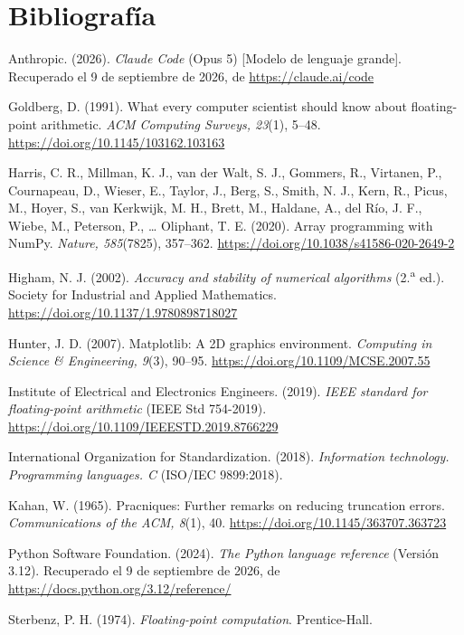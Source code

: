\section{Bibliografía}
\begin{list}{}{%
  \setlength{\leftmargin}{1.27cm}%
  \setlength{\itemindent}{-1.27cm}%
  \setlength{\labelwidth}{0pt}%
  \setlength{\labelsep}{0pt}%
  \setlength{\itemsep}{0.6em}%
  \setlength{\parsep}{0pt}%
}
  \item[] Anthropic. (2026). \textit{Claude Code} (Opus 5) [Modelo de lenguaje grande]. Recuperado el 9 de septiembre de 2026, de \url{https://claude.ai/code}

  \item[] Goldberg, D. (1991). What every computer scientist should know about floating-point arithmetic. \textit{ACM Computing Surveys, 23}(1), 5--48. \url{https://doi.org/10.1145/103162.103163}

  \item[] Harris, C. R., Millman, K. J., van der Walt, S. J., Gommers, R., Virtanen, P., Cournapeau, D., Wieser, E., Taylor, J., Berg, S., Smith, N. J., Kern, R., Picus, M., Hoyer, S., van Kerkwijk, M. H., Brett, M., Haldane, A., del Río, J. F., Wiebe, M., Peterson, P., \ldots{} Oliphant, T. E. (2020). Array programming with NumPy. \textit{Nature, 585}(7825), 357--362. \url{https://doi.org/10.1038/s41586-020-2649-2}

  \item[] Higham, N. J. (2002). \textit{Accuracy and stability of numerical algorithms} (2.\textsuperscript{a} ed.). Society for Industrial and Applied Mathematics. \url{https://doi.org/10.1137/1.9780898718027}

  \item[] Hunter, J. D. (2007). Matplotlib: A 2D graphics environment. \textit{Computing in Science \& Engineering, 9}(3), 90--95. \url{https://doi.org/10.1109/MCSE.2007.55}

  \item[] Institute of Electrical and Electronics Engineers. (2019). \textit{IEEE standard for floating-point arithmetic} (IEEE Std 754-2019). \url{https://doi.org/10.1109/IEEESTD.2019.8766229}

  \item[] International Organization for Standardization. (2018). \textit{Information technology. Programming languages. C} (ISO/IEC 9899:2018).

  \item[] Kahan, W. (1965). Pracniques: Further remarks on reducing truncation errors. \textit{Communications of the ACM, 8}(1), 40. \url{https://doi.org/10.1145/363707.363723}

  \item[] Python Software Foundation. (2024). \textit{The Python language reference} (Versión 3.12). Recuperado el 9 de septiembre de 2026, de \url{https://docs.python.org/3.12/reference/}

  \item[] Sterbenz, P. H. (1974). \textit{Floating-point computation}. Prentice-Hall.
\end{list}
